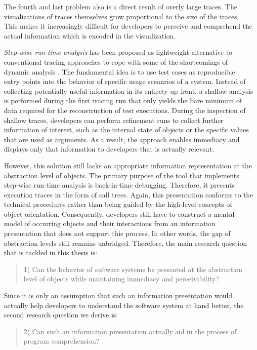 The fourth and last problem also is a direct result of overly large traces.
The visualizations of traces themselves grow proportional to the size of the traces.
This makes it increasingly difficult for developers to perceive and comprehend the actual information which is encoded in the visualization.

\emph{Step-wise run-time analysis} has been proposed as lightweight alternative to conventional tracing approaches to cope with some of the shortcomings of dynamic analysis  \cite{perscheid_immediacy_2010}.
The fundamental idea is to use test cases as reproducible entry points into the behavior of specific usage scenarios of a system.
Instead of collecting potentially useful information in its entirety up front, a shallow analysis is performed during the first tracing run that only yields the bare minimum of data required for the reconstruction of test executions.
During the inspection of shallow traces, developers can perform refinement runs to collect further information of interest, such as the internal state of objects or the specific values that are used as arguments.
As a result, the approach enables immediacy and displays only that information to developers that is actually relevant.

However, this solution still lacks an appropriate information representation at the abstraction level of objects.
The primary purpose of the tool that implements step-wise run-time analysis is back-in-time debugging.
Therefore, it presents execution traces in the form of call trees.
Again, this presentation conforms to the technical procedures rather than being guided by the high-level concepts of object-orientation.
Consequently, developers still have to construct a mental model of occurring objects and their interactions from an information presentation that does not support this process.
In other words, the gap of abstraction levels still remains unbridged.
Therefore, the main research question that is tackled in this thesis is:

\begin{quote}
1) Can the behavior of software systems be presented at the abstraction level of objects while maintaining immediacy and perceivability?
\end{quote}

Since it is only an assumption that such an information presentation would actually help developers to understand the software system at hand better, the second research question we derive is:

\begin{quote}
2) Can such an information presentation actually aid in the process of program comprehension?
\end{quote}

